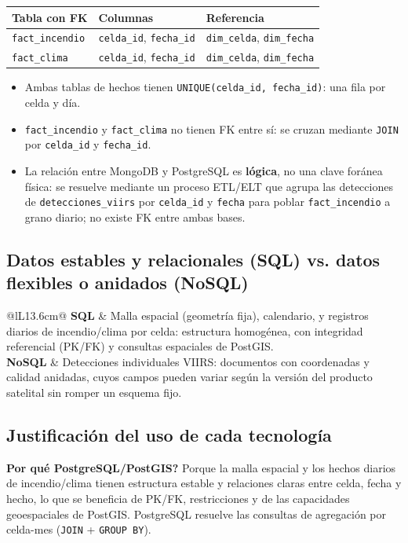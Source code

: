 \documentclass[11pt,a4paper]{article}
\begin{document}
\begin{center}
\footnotesize
\begin{tabular}{@{}lll@{}}
\toprule
\textbf{Tabla con FK} & \textbf{Columnas} & \textbf{Referencia} \\
\midrule
\texttt{fact\_incendio} & \texttt{celda\_id}, \texttt{fecha\_id} & \texttt{dim\_celda}, \texttt{dim\_fecha} \\
\texttt{fact\_clima} & \texttt{celda\_id}, \texttt{fecha\_id} & \texttt{dim\_celda}, \texttt{dim\_fecha} \\
\bottomrule
\end{tabular}
\end{center}

\begin{itemize}
    \item Ambas tablas de hechos tienen \texttt{UNIQUE(celda\_id, fecha\_id)}: una fila por celda y d\'ia.
    \item \texttt{fact\_incendio} y \texttt{fact\_clima} no tienen FK entre s\'i: se cruzan mediante \texttt{JOIN} por \texttt{celda\_id} y \texttt{fecha\_id}.
    \item La relaci\'on entre MongoDB y PostgreSQL es \textbf{l\'ogica}, no una clave for\'anea f\'isica: se resuelve mediante un proceso ETL/ELT que agrupa las detecciones de \texttt{detecciones\_viirs} por \texttt{celda\_id} y \texttt{fecha} para poblar \texttt{fact\_incendio} a grano diario; no existe FK entre ambas bases.
\end{itemize}

\subsection{Datos estables y relacionales (SQL) vs. datos flexibles o anidados (NoSQL)}
\begin{tabular}{@{}lL{13.6cm}@{}}
\toprule
\textbf{SQL} & Malla espacial (geometr\'ia fija), calendario, y registros diarios de incendio/clima por celda: estructura homog\'enea, con integridad referencial (PK/FK) y consultas espaciales de PostGIS. \\
\midrule
\textbf{NoSQL} & Detecciones individuales VIIRS: documentos con coordenadas y calidad anidadas, cuyos campos pueden variar seg\'un la versi\'on del producto satelital sin romper un esquema fijo. \\
\bottomrule
\end{tabular}

\subsection{Justificaci\'on del uso de cada tecnolog\'ia}
\textbf{\textquestiondown Por qu\'e PostgreSQL/PostGIS?} Porque la malla espacial y los hechos diarios de incendio/clima tienen estructura estable y relaciones claras entre celda, fecha y hecho, lo que se beneficia de PK/FK, restricciones y de las capacidades geoespaciales de PostGIS. PostgreSQL resuelve las consultas de agregaci\'on por celda-mes (\texttt{JOIN} + \texttt{GROUP BY}).
\end{document}
